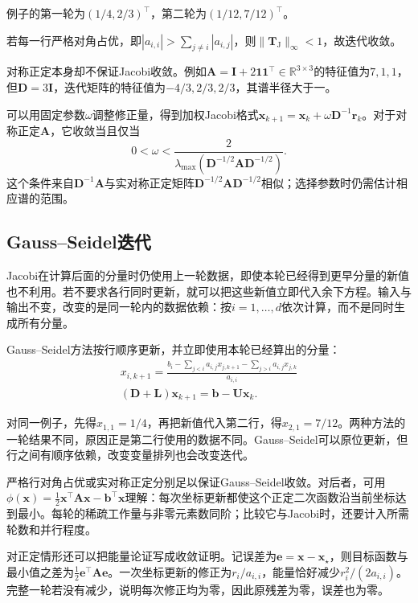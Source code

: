例子的第一轮为$(1/4,2/3)^\top$，第二轮为$(1/12,7/12)^\top$。

若每一行严格对角占优，即$|a_{i,i}|>\sum_{j\ne i}|a_{i,j}|$，则$\lVert\bm T_{\mathrm J}\rVert_\infty<1$，故迭代收敛。

对称正定本身却不保证Jacobi收敛。例如$\bm A=\bm I+2\bm1\bm1^\top\in\mathbb R^{3\times3}$的特征值为$7,1,1$，但$\bm D=3\bm I$，迭代矩阵的特征值为$-4/3,2/3,2/3$，其谱半径大于一。

可以用固定参数$\omega$调整修正量，得到加权Jacobi格式$\bm x_{k+1}=\bm x_{k}+\omega\bm D^{-1}\bm r_{k}$。对于对称正定$\bm A$，它收敛当且仅当
\[
 0<\omega<\frac{2}{\lambda_{\max}(\bm D^{-1/2}\bm A\bm D^{-1/2})}.
\]
这个条件来自$\bm D^{-1}\bm A$与实对称正定矩阵$\bm D^{-1/2}\bm A\bm D^{-1/2}$相似；选择参数时仍需估计相应谱的范围。

\subsection{Gauss--Seidel迭代}

Jacobi在计算后面的分量时仍使用上一轮数据，即使本轮已经得到更早分量的新值也不利用。若不要求各行同时更新，就可以把这些新值立即代入余下方程。输入与输出不变，改变的是同一轮内的数据依赖：按$i=1,\ldots,d$依次计算，而不是同时生成所有分量。

Gauss--Seidel方法按行顺序更新，并立即使用本轮已经算出的分量：
\begin{equation}
\begin{gathered}
x_{i,k+1}=\frac{b_i-\sum_{j<i}a_{i,j}x_{j,k+1}-\sum_{j>i}a_{i,j}x_{j,k}}{a_{i,i}}\\
(\bm D+\bm L)\bm x_{k+1}=\bm b-\bm U\bm x_{k}.
\end{gathered}
\label{eq:ls-gauss-seidel-update}
\end{equation}

对同一例子，先得$x_{1,1}=1/4$，再把新值代入第二行，得$x_{2,1}=7/12$。两种方法的一轮结果不同，原因正是第二行使用的数据不同。Gauss--Seidel可以原位更新，但行之间有顺序依赖，改变变量排列也会改变迭代。

严格行对角占优或实对称正定分别足以保证Gauss--Seidel收敛。对后者，可用$\phi(\bm x)=\tfrac12\bm x^\top\bm A\bm x-\bm b^\top\bm x$理解：每次坐标更新都使这个正定二次函数沿当前坐标达到最小。每轮的稀疏工作量与非零元素数同阶；比较它与Jacobi时，还要计入所需轮数和并行程度。

对正定情形还可以把能量论证写成收敛证明。记误差为$\bm e=\bm x-\bm x_\star$，则目标函数与最小值之差为$\frac12\bm e^\top\bm A\bm e$。一次坐标更新的修正为$r_i/a_{i,i}$，能量恰好减少$r_i^2/(2a_{i,i})$。完整一轮若没有减少，说明每次修正均为零，因此原残差为零，误差也为零。

